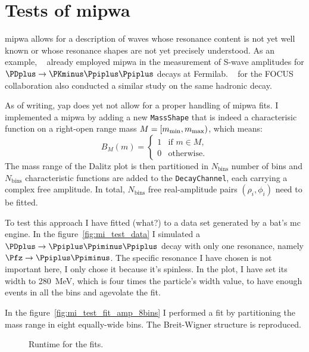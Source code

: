 \documentclass[
	fontsize=10pt,
	open=right,
	twoside,
    english,
    draft,
]{scrbook}
\begin{document}
    \section{Tests of \acs{mipwa}}
    \ac{mipwa} allows for a description of waves whose resonance content is not yet well known or whose resonance shapes are not yet precisely understood.
    As an example, \citeauthor{PhysRevD.73.032004}~\cite{PhysRevD.73.032004} already employed \ac{mipwa} in the measurement of S-wave amplitudes for $\PDplus\to\PKminus\Ppiplus\Ppiplus$ decays at Fermilab.
    \citeauthor{Link200914}~\cite{Link200914} for the FOCUS collaboration also conducted a similar study on the same hadronic decay.


    As of writing, \ac{yap} does yet not allow for a proper handling of \ac{mipwa} fits.
    I implemented a \ac{mipwa} by adding a new \lstinline!MassShape! that is indeed a characterisic function on a right-open range mass $M = [m_\textup{min}, m_\textup{max})$, which means:
    \begin{equation}
        B_M(m) = 
        \begin{cases}
            1 &\text{if }m\in M, \\
            0 &\text{otherwise}.
        \end{cases}
    \end{equation}
    The mass range of the Dalitz plot is then partitioned in $N_\text{bins}$ number of bins and $N_\text{bins}$ characteristic functions are added to the \lstinline!DecayChannel!, each carrying a complex free amplitude.
    In total, $N_\text{bins}$ free real-amplitude pairs $(\rho_i,\phi_i)$ need to be fitted.


    To test this approach I have fitted (what?) to a data set generated by a \ac{bat}'s \ac{mc} engine.
    In the figure~\ref{fig:mi_test_data} I simulated a $\PDplus\to\Ppiplus\Ppiminus\Ppiplus$ decay with only one resonance, namely $\Pfz\to\Ppiplus\Ppiminus$.
    The specific resonance I have chosen is not important here, I only chose it because it's spinless.
    In the plot, I have set its width to \SI{280}{\mega\electronvolt}, which is four times the particle's width value, to have enough events in all the bins and agevolate the fit.


    In the figure~\ref{fig:mi_test_fit_amp_8bins} I performed a fit by partitioning the mass range in eight equally-wide bins.
    The Breit-Wigner structure is reproduced.

    \begin{figure}
        \centering
        \caption{Runtime for the fits.}
    \end{figure}
\end{document}
